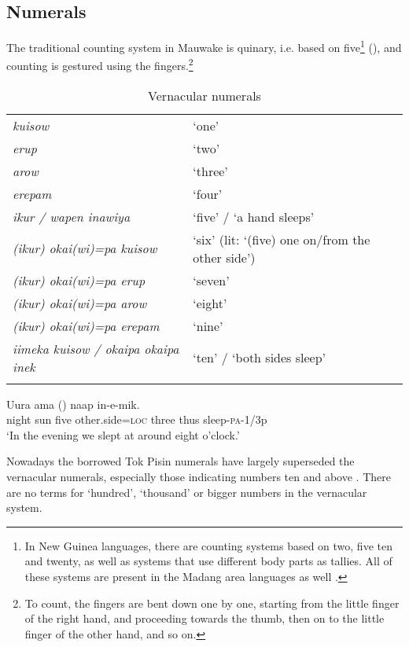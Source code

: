 \subsection{Numerals}\label{sec:3.4.1}
{}
The traditional counting system in Mauwake is quinary, i.e. based on five\footnote{In New Guinea languages, there are counting systems based on two, five ten and twenty, as well as systems that use different body parts as tallies. All of these systems are present in the Madang area languages as well \citep{Lean1991}.}  (), and counting is gestured using the fingers.\footnote{To count, the fingers are bent down one by one, starting from the little finger of the right hand, and proceeding towards the thumb, then on to the little finger of the other hand, and so on.} 

\begin{table}
\caption{Vernacular numerals}
\label{tab:3:numerals}
 
\begin{tabular}{>{\itshape}ll}
\mytoprule
kuisow &`one'\\
erup &`two'\\
arow &`three'\\
erepam &`four'\\
ikur / wapen inawiya &`five' / `a hand sleeps'\\
(ikur) okai(wi)=pa kuisow &`six' (lit: `(five) one on/from the other side')\\
(ikur) okai(wi)=pa erup &`seven'\\
(ikur) okai(wi)=pa arow &`eight'\\
(ikur) okai(wi)=pa erepam &`nine'\\
iimeka kuisow / okaipa okaipa inek &`ten' / `both sides sleep'\\
\mybottomrule
\end{tabular}
\end{table}


\ea%
\label{ex:3:x90}
\gll Uura ama  ()  naap in-e-mik. \\
night sun five other.side=\textsc{loc} three thus sleep-\textsc{pa}-1/3p\\
\glt`In the evening we slept at around eight o'clock.'
\z

Nowadays the borrowed Tok Pisin numerals have largely superseded the vernacular numerals, especially those indicating numbers ten and above . There are no terms for `hundred', `thousand' or bigger numbers in the vernacular system.

